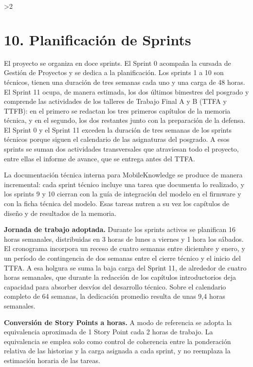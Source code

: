 \documentclass[
11pt, %
]{charter}
\providecommand{\revision}{1}
\begin{document}
\ifnum\revision>2
\section{10. Planificación de Sprints}
\label{sec:sprints}

El proyecto se organiza en doce sprints. El Sprint 0 acompaña la cursada de Gestión de Proyectos y se dedica a la planificación. Los sprints 1 a 10 son técnicos, tienen una duración de tres semanas cada uno y una carga de 48 horas. El Sprint 11 ocupa, de manera estimada, los dos últimos bimestres del posgrado y comprende las actividades de los talleres de Trabajo Final A y B (TTFA y TTFB): en el primero se redactan los tres primeros capítulos de la memoria técnica, y en el segundo, los dos restantes junto con la preparación de la defensa. El Sprint 0 y el Sprint 11 exceden la duración de tres semanas de los sprints técnicos porque siguen el calendario de las asignaturas del posgrado. A esos sprints se suman dos actividades transversales que atraviesan todo el proyecto, entre ellas el informe de avance, que se entrega antes del TTFA.

La documentación técnica interna para MobileKnowledge se produce de manera incremental: cada sprint técnico incluye una tarea que documenta lo realizado, y los sprints 9 y 10 cierran con la guía de integración del modelo en el firmware y con la ficha técnica del modelo. Esas tareas nutren a su vez los capítulos de diseño y de resultados de la memoria.

\textbf{Jornada de trabajo adoptada.} Durante los sprints activos se planifican 16 horas semanales, distribuidas en 3 horas de lunes a viernes y 1 hora los sábados. El cronograma incorpora un receso de cuatro semanas entre diciembre y enero, y un período de contingencia de dos semanas entre el cierre técnico y el inicio del TTFA. A esa holgura se suma la baja carga del Sprint 11, de alrededor de cuatro horas semanales, que durante la redacción de los capítulos introductorios deja capacidad para absorber desvíos del desarrollo técnico. Sobre el calendario completo de 64 semanas, la dedicación promedio resulta de unas 9,4 horas semanales.

\textbf{Conversión de Story Points a horas.} A modo de referencia se adopta la equivalencia aproximada de 1 Story Point cada 2 horas de trabajo. La equivalencia se emplea solo como control de coherencia entre la ponderación relativa de las historias y la carga asignada a cada sprint, y no reemplaza la estimación horaria de las tareas.
\end{document}
